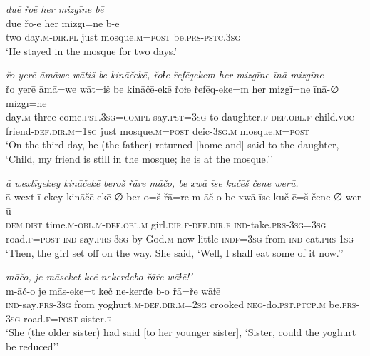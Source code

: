 \ea \label{ŽH.36}
\textit{duē řoē her mizgīne bē} \\ 
\gll duē řo-ē her mizgī=ne b-ē \\ 
 two day\textsc{.m}\textsc{-dir}\textsc{.pl} just mosque\textsc{.m}\textsc{=\textsc{post}} be\textsc{.prs}\textsc{-pstc}\textsc{.3sg} \\ 
\glt `He stayed in the mosque for two days.'
\z 
 
\ea \label{ŽH.37}
\textit{řo yerē āmāwe wātiš be kināčekē, řoɫe řefēqekem her mizgīne īnā mizgīne} \\ 
\gll řo yerē āmā=we wāt=iš be kināčē-ekē řoɫe řefēq-eke=m her mizgī=ne īnā-∅ mizgī=ne \\ 
 day\textsc{.m} three come\textsc{.pst}\textsc{.3sg}\textsc{=compl} say\textsc{.pst}\textsc{=3sg} to daughter\textsc{\textsc{.f}}\textsc{-def}\textsc{.obl}\textsc{\textsc{.f}} child.\textsc{voc} friend\textsc{-def}\textsc{.dir}\textsc{.m}\textsc{=1sg} just mosque\textsc{.m}\textsc{=\textsc{post}} deic\textsc{-3sg}\textsc{.m} mosque\textsc{.m}\textsc{=\textsc{post}} \\ 
\glt `On the third day, he (the father) returned [home and] said to the daughter, ‘Child, my friend is still in the mosque; he is at the mosque.’'
\z 
 
\ea \label{ŽH.41}
\textit{ā wextīyekey kināčekē beroš řāre māčo, be xwā īse kučēš čene werū.} \\ 
\gll ā wext-ī-ekey kināčē-ekē ∅-ber-o=š řā=re m-āč-o be xwā īse kuč-ē=š čene ∅-wer-ū \\ 
 \textsc{dem.dist} time\textsc{.m}\textsc{-obl}\textsc{.m}\textsc{-def}\textsc{.obl}\textsc{.m} girl\textsc{.dir}\textsc{\textsc{.f}}\textsc{-def}\textsc{.dir}\textsc{\textsc{.f}} \textsc{ind-}take\textsc{.prs}\textsc{-3sg}\textsc{=3sg} road\textsc{\textsc{.f}}\textsc{=\textsc{post}} \textsc{ind-}say\textsc{.prs}\textsc{-3sg} by God\textsc{.m} now little\textsc{-indf}\textsc{=3sg} from \textsc{ind-}eat\textsc{.prs}\textsc{-1sg} \\ 
\glt `Then, the girl set off on the way. She said, ‘Well, I shall eat some of it now.’'
\z 
 
\ea \label{ŽH.48}
\textit{māčo, je māseket keč nekerđebo řāře wāɫē!’} \\ 
\gll m-āč-o je mās-eke=t keč ne-kerđe b-o řā=ře wāɫē \\ 
 \textsc{ind-}say\textsc{.prs}\textsc{-3sg} from yoghurt\textsc{.m}\textsc{-def}\textsc{.dir}\textsc{.m}\textsc{=\textsc{2sg}} crooked \textsc{neg-}do\textsc{.pst}\textsc{.ptcp}\textsc{.m} be\textsc{.prs}\textsc{-3sg} road\textsc{\textsc{.f}}\textsc{=\textsc{post}} sister\textsc{\textsc{.f}} \\ 
\glt `She (the older sister) had said [to her younger sister], ‘Sister, could the yoghurt be reduced’'
\z 
 
